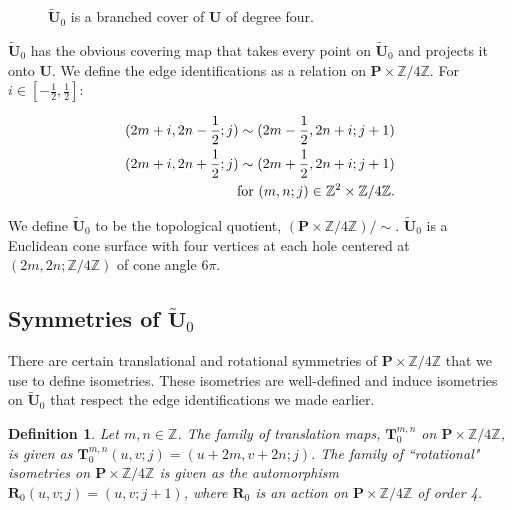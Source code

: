 \documentclass[]{article}
\newtheorem{Def}{Definition}[subsection]
\begin{document}
\begin{figure}[H]
\centering

\label{fig:utilda0}
\caption{$\tilde{\mathbf{U}}_0$ is a branched cover of $\mathbf{U}$ of degree four.}
\end{figure}

$\tilde{\mathbf{U}}_0$ has the obvious covering map that takes every point on $\tilde{\mathbf{U}}_0$ and projects it onto $\mathbf{U}$. We define the edge identifications as a relation on $\mathbf{P}\times\mathbb{Z}/4\mathbb{Z}$. For $i\in[-\frac{1}{2},\frac{1}{2}]$:



\begin{equation}
\begin{split}
(2m+i, 2n-\frac{1}{2};j)\sim(2m-\frac{1}{2},2n+i;j+1)\\
(2m+i, 2n+\frac{1}{2};j)\sim(2m+\frac{1}{2},2n+i;j+1)\\
\vspace{0.2in}\text{for } (m,n;j) \in \mathbb{Z}^{2}\times\mathbb{Z}/4\mathbb{Z}.
\label{eq:rel2}
\end{split}
\end{equation}

We define $\tilde{\mathbf{U}}_0$ to be the topological quotient, $(\mathbf{P}\times\mathbb{Z}/4\mathbb{Z})/\sim$. $\tilde{\mathbf{U}}_0$ is a Euclidean cone surface with four vertices at each hole centered at $(2m,2n;\mathbb{Z}/4\mathbb{Z})$ of cone angle $6\pi$.

\subsection{Symmetries of $\tilde{\mathbf{U}}_0$}
There are certain translational and rotational symmetries of $\mathbf{P}\times\mathbb{Z}/4\mathbb{Z}$ that we use to define isometries. These isometries are well-defined and induce isometries on $\tilde{\mathbf{U}}_0$ that respect the edge identifications we made earlier.

\begin{Def}Let $m,n\in\mathbb{Z}$. The {family of translation maps}, $\mathbf{T}^{m,n}_{0}$ on $\mathbf{P}\times\mathbb{Z}/4\mathbb{Z}$, is given as $\mathbf{T}^{m,n}_{0}(u,v;j)=(u+2m,v+2n;j)$.\newline
The {family of ``rotational" isometries} on $\mathbf{P}\times\mathbb{Z}/4\mathbb{Z}$ is given as the automorphism $\mathbf{R}_0(u,v;j)=(u,v;j+1)$, where $\mathbf{R}_0$ is an action on $\mathbf{P}\times\mathbb{Z}/4\mathbb{Z}$ of order 4.
\end{Def}
\end{document}
